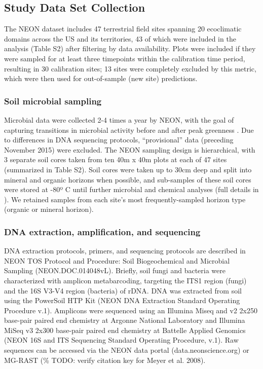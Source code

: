\documentclass[11pt]{article}
\begin{document}
\subsection{Study Data Set Collection}

The NEON dataset includes 47 terrestrial field sites spanning 20 ecoclimatic domains across the US and its territories, 43 of which were included in the analysis (Table S2) after filtering by data availability. Plots were included if they were sampled for at least three timepoints within the calibration time period, resulting in 30 calibration sites; 13 sites were completely excluded by this metric, which were then used for out-of-sample (new site) predictions.

\subsubsection{Soil microbial sampling}

Microbial data were collected 2-4 times a year by NEON, with the goal of capturing transitions in microbial activity before and after peak greenness \cite{stanish_neondoc000908_2018}. Due to differences in DNA sequencing protocols, “provisional” data (preceding November 2015) were excluded. The NEON sampling design is hierarchical, with 3 separate soil cores taken from ten 40m x 40m plots at each of 47 sites (summarized in Table S2). Soil cores were taken up to 30cm deep and split into mineral and organic horizons when possible, and sub-samples of these soil cores were stored at -80º C until further microbial and chemical analyses (full details in \cite{stanish_tos_2018}). We retained samples from each site’s most frequently-sampled horizon type (organic or mineral horizon).

\subsubsection{DNA extraction, amplification, and sequencing}

DNA extraction protocols, primers, and sequencing protocols are described in NEON TOS Protocol and Procedure: Soil Biogeochemical and Microbial Sampling (NEON.DOC.014048vL). Briefly, soil fungi and bacteria were characterized with amplicon metabarcoding, targeting the ITS1 region (fungi) and the 16S V3-V4 region (bacteria) of rDNA. DNA was extracted from soil using the PowerSoil HTP Kit (NEON DNA Extraction Standard Operating Procedure v.1). Amplicons were sequenced using an Illumina Miseq and v2 2x250 base-pair paired end chemistry at Argonne National Laboratory and Illumina MiSeq v3 2x300 base-pair paired end chemistry at Battelle Applied Genomics (NEON 16S and ITS Sequencing Standard Operating Procedure, v.1). Raw sequences can be accessed via the NEON data portal (data.neonscience.org) or MG-RAST (\% TODO: verify citation key for Meyer et al. 2008). 
\end{document}
